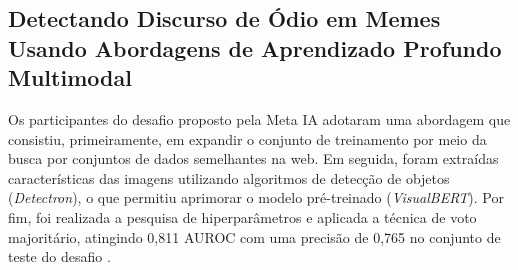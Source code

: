 \subsection{Detectando Discurso de Ódio em Memes Usando Abordagens de Aprendizado Profundo Multimodal} 

Os participantes do desafio proposto pela Meta IA adotaram uma abordagem que consistiu, primeiramente, em expandir o conjunto de treinamento por meio da busca por conjuntos de dados semelhantes na web. Em seguida, foram extraídas características das imagens utilizando algoritmos de detecção de objetos (\textit{Detectron}), o que permitiu aprimorar o modelo pré-treinado (\textit{VisualBERT}). Por fim, foi realizada a pesquisa de hiperparâmetros e aplicada a técnica de voto majoritário, atingindo 0,811 AUROC com uma precisão de 0,765 no conjunto de teste do desafio \cite{velioglu2020hateful}.
